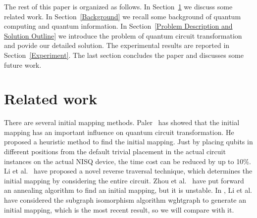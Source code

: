 \documentclass[journal]{IEEEtran}
\begin{document}
The rest of this paper is organized as follows.
In Section~\ref{Related work} we discuss some related work. In Section~\ref{Background}
we recall some background of quantum computing and quantum information. In Section~\ref{Problem Description and Solution Outline} 
we introduce the problem of  quantum circuit transformation and povide our detailed solution.
The experimental results are reported in Section~\ref{Experiment}. 
The last section concludes the paper and discusses some future work.


\section{Related work}
\label{Related work}
There are several initial mapping methods. Paler~\cite{Paler2018} has showed that the initial mapping has an important influence on quantum circuit transformation. He proposed a heuristic method to find the initial mapping. Just by placing qubits in different positions from the default trivial placement
 in the actual circuit instances on the actual NISQ device, the time cost can be reduced by up to 10\%. Li et al.~\cite{Li2018} have proposed a novel reverse traversal technique, which determines the initial mapping by considering the entire circuit. Zhou et al.~\cite{Xiangzhen2020} have put forward an annealing algorithm to find an initial mapping, but it is unstable. In \cite{2020Qubit}, Li et al. have considered the subgraph isomorphism algorithm wghtgraph to generate an initial mapping, which is the most recent result, so we will compare with it.
\end{document}
